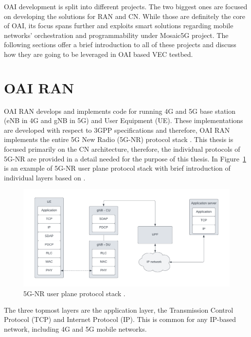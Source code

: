 \documentclass[12pt,a4paper,twoside]{report}
\begin{document}
OAI development is split into different projects. The two biggest ones are focused on developing the solutions for RAN and CN. While those are definitely the core of OAI, its focus spans further and exploits smart solutions regarding mobile networks’ orchestration and programmability under Mosaic5G project. The following sections offer a brief introduction to all of these projects and discuss how they are going to be leveraged in OAI based VEC testbed.
%
\section{OAI RAN}
OAI RAN develops and implements code for running 4G and 5G base station (eNB in 4G and gNB in 5G) and User Equipment (UE). These implementations are developed with respect to 3GPP specifications and therefore, OAI RAN implements the entire 5G New Radio (5G-NR) protocol stack \cite{oai_doc}. This thesis is focused primarily on the CN architecture, therefore, the individual protocols of 5G-NR are provided in a detail needed for the purpose of this thesis. In Figure~\ref{F:5G-protstack} is an example of 5G-NR user plane protocol stack with brief introduction of individual layers based on \cite{dahlman-2020-5g}.
%
\begin{figure}[ht]
	\centering
	\includegraphics[width=13cm]{./images/5G-NR-protstack.pdf} 
	\caption{5G-NR user plane protocol stack \cite{dahlman-2020-5g}.}
	\label{F:5G-protstack}
\end{figure}
%
The three topmost layers are the application layer, the Transmission Control Protocol (TCP) and Internet Protocol (IP). This is common for any IP-based network, including 4G and 5G mobile networks.
\pagebreak
\end{document}
